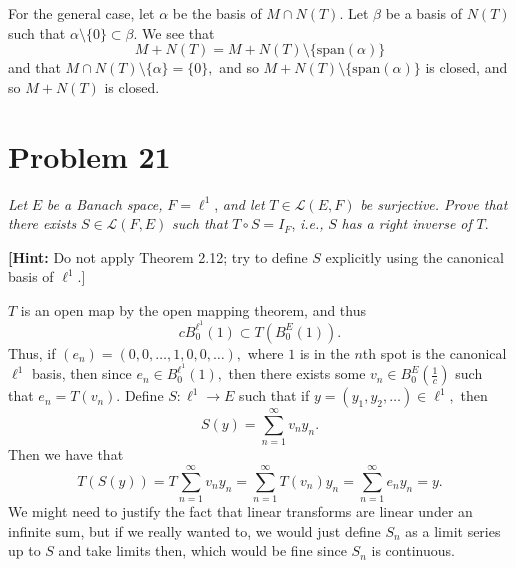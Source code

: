\documentclass[11pt]{article}
\begin{document}
\begin{problem}
\begin{solution}
    For the general case, let $\alpha$ be the basis of $M\cap N(T).$ Let $\beta$ be a basis of $N(T)$ such that $\alpha\setminus\{0\}\subset  \beta.$ We see that 
    \[M + N(T) = M + N(T)\setminus\{\text{span}(\alpha)\}\] and that $M\cap N(T)\setminus\{\alpha\} = \{0\},$ and so $M + N(T)\setminus\{\text{span}(\alpha)\}$ is closed, and so $M + N(T)$ is closed.
\end{solution}

\end{problem}



\newpage
\section*{Problem 21}
\begin{problem}
    \textit{Let } $E$ \textit{ be a Banach space, } $F = \ell^1$, \textit{ and let } $T \in \mathcal{L}(E, F)$ \textit{ be surjective. Prove that there exists } $S \in \mathcal{L}(F, E)$ \textit{ such that } $T \circ S = I_F$, \textit{ i.e., } $S$ \textit{ has a right inverse of } $T$. 

\textbf{[Hint:} Do not apply Theorem 2.12; try to define $S$ explicitly using the canonical basis of $\ell^1$.]

\end{problem}
\begin{solution}
    $T$ is an open map by the open mapping theorem, and thus 
    \[c B_0^{\ell^1}(1)\subset T(B_0^{E}(1)).\] Thus, if $(e_n) = (0,0,\dots, 1, 0, 0, \dots),$ where $1$ is in the $n$th spot is the canonical $\ell^1$ basis, then since $e_n \in B_0^{\ell^1}(1),$ then there exists some $v_n \in B_0^{E}(\frac{1}{c})$ such that $e_n = T(v_n).$ Define $S: \ell^1 \to E$ such that if $y = (y_1, y_2, \dots) \in \ell^1,$ then
    \[S(y) = \sum_{n=1}^\infty v_ny_n.\] Then we have that 
    \[T(S(y)) = T\sum_{n=1}^\infty v_n y_n = \sum_{n=1}^\infty T(v_n)y_n = \sum_{n=1}^\infty e_ny_n = y.\] We might need to justify the fact that linear transforms are linear under an infinite sum, but if we really wanted to, we would just define $S_n$ as a limit series up to $S$ and take limits then, which would be fine since $S_n$ is continuous. 
\end{solution}

\newpage
\end{document}
